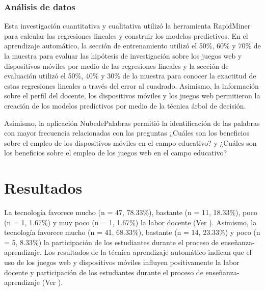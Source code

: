 \documentclass[spanish]{textolivre}
\begin{document}
\subsubsection{Análisis de datos}\label{sec-ana}
Esta investigación cuantitativa y cualitativa utilizó la herramienta RapidMiner para calcular las regresiones lineales y construir los modelos predictivos. En el aprendizaje automático, la sección de entrenamiento utilizó el 50\%, 60\% y 70\% de la muestra para evaluar las hipótesis de investigación sobre los juegos web y dispositivos móviles por medio de las regresiones lineales y la sección de evaluación utilizó el 50\%, 40\% y 30\% de la muestra para conocer la exactitud de estas regresiones lineales a través del error al cuadrado. Asimismo, la información sobre el perfil del docente, los dispositivos móviles y los juegos web permitieron la creación de los modelos predictivos por medio de la técnica árbol de decisión.

Asimismo, la aplicación NubedePalabras permitió la identificación de las palabras con mayor frecuencia relacionadas con las preguntas ¿Cuáles son los beneficios sobre el empleo de los dispositivos móviles en el campo educativo? y ¿Cuáles son los beneficios  sobre el empleo de los juegos web en el campo educativo?

\section{Resultados}
La tecnología favorece mucho (n = 47, 78.33\%), bastante (n = 11, 18.33\%), poco (n = 1, 1.67\%) y muy poco (n = 1, 1.67\%) la labor docente (Ver ). Asimismo, la tecnología favorece mucho (n = 41, 68.33\%), bastante (n = 14, 23.33\%) y poco (n = 5, 8.33\%) la participación de los estudiantes durante el proceso de enseñanza-aprendizaje. Los resultados de la técnica aprendizaje automático indican que el uso de los juegos web y dispositivos móviles influyen positivamente la labor docente y participación de los estudiantes durante el proceso de enseñanza-aprendizaje (Ver ).
\end{document}
